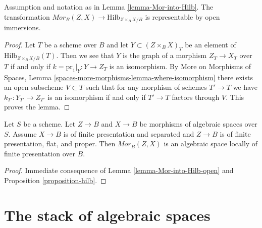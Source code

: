 \begin{lemma}
\label{lemma-Mor-into-Hilb-open}
Assumption and notation as in Lemma \ref{lemma-Mor-into-Hilb}.
The transformation
$\mathit{Mor}_B(Z, X) \longrightarrow \text{Hilb}_{Z \times_B X/B}$
is representable by open immersions.
\end{lemma}

\begin{proof}
Let $T$ be a scheme over $B$ and let $Y \subset (Z \times_B X)_T$
be an element of $\text{Hilb}_{Z \times_B X/B}(T)$. Then we see that
$Y$ is the graph of a morphism $Z_T \to X_T$ over $T$ if and only
if $k = \text{pr}_1|_Y : Y \to Z_T$ is an isomorphism. By
More on Morphisms of Spaces, Lemma
\ref{spaces-more-morphisms-lemma-where-isomorphism}
there exists an open subscheme $V \subset T$ such that
for any morphism of schemes $T' \to T$ we have
$k_{T'} : Y_{T'} \to Z_{T'}$ is an isomorphism if and
only if $T' \to T$ factors through $V$.
This proves the lemma.
\end{proof}

\begin{proposition}
\label{proposition-Mor}
Let $S$ be a scheme. Let $Z \to B$ and $X \to B$ be morphisms of algebraic
spaces over $S$. Assume $X \to B$ is of finite presentation and separated and
$Z \to B$ is of finite presentation, flat, and proper. Then
$\mathit{Mor}_B(Z, X)$ is an algebraic space locally of finite
presentation over $B$.
\end{proposition}

\begin{proof}
Immediate consequence of
Lemma \ref{lemma-Mor-into-Hilb-open}
and Proposition \ref{proposition-hilb}.
\end{proof}








\section{The stack of algebraic spaces}
\label{section-stack-of-spaces}

